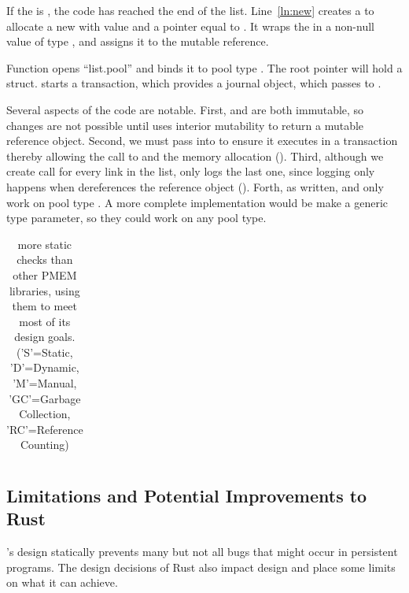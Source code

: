 If the  is , the code has reached the end of the list.  Line~\ref{ln:new} creates a  to allocate a new  with value  and a  pointer equal to .  It wraps the  in a non-null value of type , and assigns it to the mutable reference.


Function  opens ``list.pool'' and binds it to pool type .  The root pointer will hold a  struct.   starts a transaction, which provides a journal object, which  passes to .

Several aspects of the code are notable.  First,  and  are both immutable, so changes are not possible until  uses interior mutability to return a mutable reference object.  Second, we must pass  into  to ensure it executes in a transaction thereby allowing the call to   and the memory allocation ().  Third, although we create call  for every link in the list, \this{} only logs the last one, since logging only happens when  dereferences the reference object ().  Forth, as written,  and  only work on pool type .  A more complete implementation would be make  a generic type parameter, so they could work on any pool type.

\newcommand{\Dynamic}{D}
\newcommand{\Static}{S}
\newcommand{\Manual}{M}

\begin{table}
  \center
  \footnotesize
  \begin{tabular}{|l|c|c|c|c|c|c|c|c|}\hline
    
  \end{tabular}
  \caption{\This{} more static checks than other PMEM libraries, using them to meet most of its design goals. ('S'=Static, 'D'=Dynamic, 'M'=Manual, 'GC'=Garbage Collection, 'RC'=Reference Counting)}
  \label{tab:libs}
\end{table}

\subsection{Limitations and Potential Improvements to Rust}
\label{sec:discuss}

\This{}'s design statically prevents many but not all bugs that might occur in
persistent programs.  The design decisions of Rust also impact \this{} design
and place some limits on what it can achieve.

